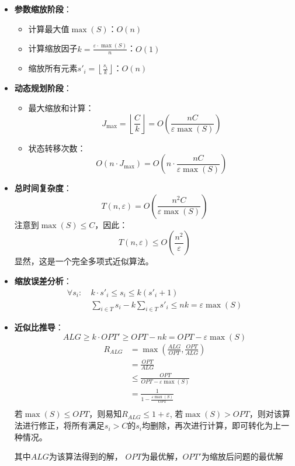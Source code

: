 \documentclass[./../main.tex]{subfiles} %
\begin{document}
\begin{itemize}
    \item \textbf{参数缩放阶段}：
    \begin{itemize}
        \item 计算最大值$\max(S)$：$O(n)$
        \item 计算缩放因子$k = \frac{\varepsilon \cdot \max(S)}{n}$：$O(1)$
        \item 缩放所有元素$s'_i = \left\lfloor \frac{s_i}{k} \right\rfloor$：$O(n)$
    \end{itemize}
    
    \item \textbf{动态规划阶段}：
    \begin{itemize}
        \item 最大缩放和计算：
        $$
        J_{\max} = \left\lfloor \frac{C}{k} \right\rfloor = O(\frac{nC}{\varepsilon \max(S)})
        $$
        
        \item 状态转移次数：
        $$
        O(n \cdot J_{\max} )= O(n \cdot \frac{nC}{\varepsilon \max(S)})
        $$
    \end{itemize}
    
    \item \textbf{总时间复杂度}：
    $$
    T(n, \varepsilon) = O(\frac{n^2C}{\varepsilon \max(S)})
    $$
    注意到$\max(S) \leq C$，因此：
    $$
    T(n, \varepsilon) \leq O(\frac{n^2}{\varepsilon})
    $$
    显然，这是一个完全多项式近似算法。
    \item \textbf{缩放误差分析}：
    \begin{align*}
        \forall s_i:\ & k \cdot s'_i \leq s_i \leq k(s'_i + 1) \\
        & \sum_{i\in T} s_i - k\sum_{i\in T} s'_i \leq nk = \varepsilon\max(S)
    \end{align*}
    
    \item \textbf{近似比推导}：
    $$
    ALG \geq k \cdot OPT' \geq OPT - nk = OPT - \varepsilon\max(S)
    $$
    \begin{align*}
        R_{ALG}&=\max{(\frac{ALG}{OPT},\frac{OPT}{ALG})}\\
        &=\frac{OPT}{ALG}\\
        &\le\frac{OPT}{OPT-\varepsilon\max(S)}\\
        &=\frac{1}{1-\frac{\varepsilon\max(S)}{OPT}}\\
    \end{align*}
    若$\max(S)\le OPT$，则易知$R_{ALG}\le 1+\varepsilon$, 若$\max(S)>OPT$，则对该算法进行修正，将所有满足$s_i>C$的$s_i$均删除，再次进行计算，即可转化为上一种情况。

    其中$ALG$为该算法得到的解， $OPT$为最优解，$OPT'$为缩放后问题的最优解
\end{itemize}
\end{document}
